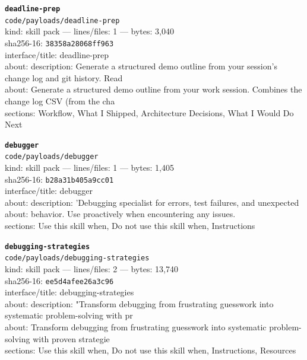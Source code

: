 \noindent\textbf{\texttt{deadline-prep}}\\
\texttt{code/payloads/deadline-prep}\\
kind: skill pack --- lines/files: 1 --- bytes: 3,040\\
sha256-16: \texttt{38358a28068ff963}\\
interface/title: deadline-prep\\
about: description: Generate a structured demo outline from your session's change log and git history. Read\\
about: Generate a structured demo outline from your work session. Combines the change log CSV (from the cha\\
sections: Workflow, What I Shipped, Architecture Decisions, What I Would Do Next\\
\vspace*{6.0pt}

\noindent\textbf{\texttt{debugger}}\\
\texttt{code/payloads/debugger}\\
kind: skill pack --- lines/files: 1 --- bytes: 1,405\\
sha256-16: \texttt{b28a31b405a9cc01}\\
interface/title: debugger\\
about: description: 'Debugging specialist for errors, test failures, and unexpected\\
about: behavior. Use proactively when encountering any issues.\\
sections: Use this skill when, Do not use this skill when, Instructions\\
\vspace*{6.0pt}

\noindent\textbf{\texttt{debugging-strategies}}\\
\texttt{code/payloads/debugging-strategies}\\
kind: skill pack --- lines/files: 2 --- bytes: 13,740\\
sha256-16: \texttt{ee5d4afee26a3c96}\\
interface/title: debugging-strategies\\
about: description: "Transform debugging from frustrating guesswork into systematic problem-solving with pr\\
about: Transform debugging from frustrating guesswork into systematic problem-solving with proven strategie\\
sections: Use this skill when, Do not use this skill when, Instructions, Resources\\
\vspace*{6.0pt}
\newpage

